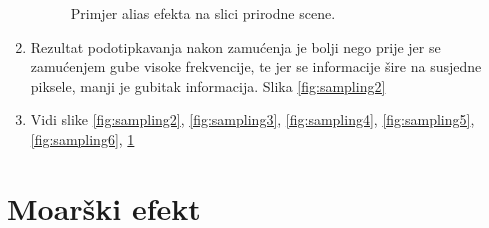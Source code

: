 \documentclass[12pt, a4]{report}
\begin{document}
\begin{enumerate}
\begin{figure}
                    \caption{Primjer alias efekta na slici prirodne scene.}    
                    \label{fig:sampling7}
                \end{figure}
                \item 
                    Rezultat podotipkavanja nakon zamućenja je bolji nego prije jer se zamućenjem gube visoke frekvencije, te jer se informacije 
                    šire na susjedne piksele, manji je gubitak informacija. Slika \ref{fig:sampling2}               
                \item
                    Vidi slike \ref{fig:sampling2}, \ref{fig:sampling3}, \ref{fig:sampling4}, \ref{fig:sampling5}, \ref{fig:sampling6}, \ref{fig:sampling7}
            \end{enumerate}
        \section{Moarški efekt}
\end{document}
